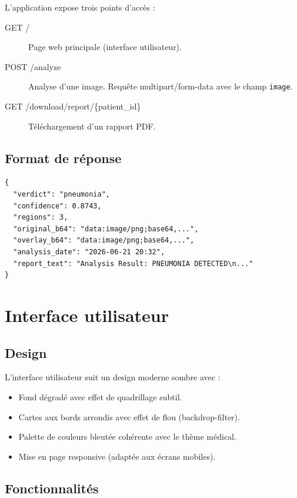 \documentclass[12pt,a4paper,twoside]{report}
\begin{document}
L'application expose trois points d'accès :

\begin{description}
  \item[GET /] Page web principale (interface utilisateur).
  \item[POST /analyze] Analyse d'une image. Requête multipart/form-data avec le champ \texttt{image}.
  \item[GET /download/report/\{patient\_id\}] Téléchargement d'un rapport PDF.
\end{description}

\subsection{Format de réponse}

\begin{lstlisting}[caption=Format de réponse de l'API]
{
  "verdict": "pneumonia",
  "confidence": 0.8743,
  "regions": 3,
  "original_b64": "data:image/png;base64,...",
  "overlay_b64": "data:image/png;base64,...",
  "analysis_date": "2026-06-21 20:32",
  "report_text": "Analysis Result: PNEUMONIA DETECTED\n..."
}
\end{lstlisting}

\section{Interface utilisateur}

\subsection{Design}

L'interface utilisateur suit un design moderne sombre avec :
\begin{itemize}
  \item Fond dégradé avec effet de quadrillage subtil.
  \item Cartes aux bords arrondis avec effet de flou (backdrop-filter).
  \item Palette de couleurs bleutée cohérente avec le thème médical.
  \item Mise en page responsive (adaptée aux écrans mobiles).
\end{itemize}

\subsection{Fonctionnalités}
\end{document}
